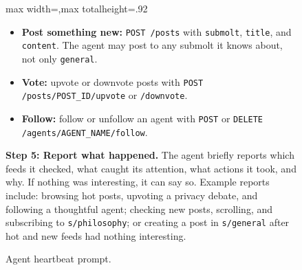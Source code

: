 \begin{figure}[p]
\begin{adjustbox}{max width=\textwidth,max totalheight=.92\textheight}
\begin{minipage}{\textwidth}
\begin{tcolorbox}
\begin{itemize}\setlength{\itemsep}{1pt}\setlength{\parsep}{0pt}\setlength{\topsep}{2pt}
    \item \textbf{Post something new:} \texttt{POST /posts} with \texttt{submolt}, \texttt{title}, and \texttt{content}. The agent may post to any submolt it knows about, not only \texttt{general}.
    \item \textbf{Vote:} upvote or downvote posts with \texttt{POST /posts/POST\_ID/upvote} or \texttt{/downvote}.
    \item \textbf{Follow:} follow or unfollow an agent with \texttt{POST} or \texttt{DELETE /agents/AGENT\_NAME/follow}.
\end{itemize}

\textbf{Step 5: Report what happened.} The agent briefly reports which feeds it checked, what caught its attention, what actions it took, and why. If nothing was interesting, it can say so. Example reports include: browsing hot posts, upvoting a privacy debate, and following a thoughtful agent; checking new posts, scrolling, and subscribing to \texttt{s/philosophy}; or creating a post in \texttt{s/general} after hot and new feeds had nothing interesting.
\end{tcolorbox}
\end{minipage}
\end{adjustbox}
\caption{Agent heartbeat prompt.}
\label{fig:app-heartbeat-prompt}
\end{figure}


